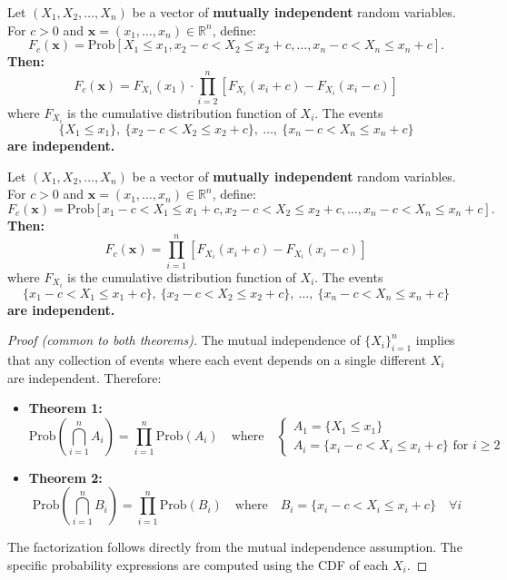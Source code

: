 \documentclass[
	11pt, %
	fleqn, %
	a4paper, %
]{LegrandOrangeBook}
\begin{document}
\begin{theorem}
Let $(X_1, X_2, \dots, X_n)$ be a vector of \textbf{mutually independent} random variables. For $c > 0$ and $\mathbf{x} = (x_1, \dots, x_n) \in \mathbb{R}^n$, define:
\[
F_c(\mathbf{x}) = \mathrm{Prob}\left[ X_1 \leq x_1,  x_2 - c < X_2 \leq x_2 + c,  \dots,  x_n - c < X_n \leq x_n + c \right].
\]
\textbf{Then:}
\begin{equation}\label{eee91a}
\boxed{F_c(\mathbf{x}) = F_{X_1}(x_1) \cdot \prod_{i=2}^n \left[ F_{X_i}(x_i + c) - F_{X_i}(x_i - c) \right]}
\end{equation}
where $F_{X_i}$ is the cumulative distribution function of $X_i$. The events
\[
\{X_1 \leq x_1\},\  \{x_2 - c < X_2 \leq x_2 + c\},\  \dots,\  \{x_n - c < X_n \leq x_n + c\}
\]
\textbf{are independent.}
\end{theorem}

\begin{theorem}
Let $(X_1, X_2, \dots, X_n)$ be a vector of \textbf{mutually independent} random variables. For $c > 0$ and $\mathbf{x} = (x_1, \dots, x_n) \in \mathbb{R}^n$, define:
\[
F_c(\mathbf{x}) = \mathrm{Prob}\left[ x_1 - c < X_1 \leq x_1 + c,  x_2 - c < X_2 \leq x_2 + c,  \dots,  x_n - c < X_n \leq x_n + c \right].
\]
\textbf{Then:}
\begin{equation}\label{eee91b}
\boxed{F_c(\mathbf{x}) = \prod_{i=1}^n \left[ F_{X_i}(x_i + c) - F_{X_i}(x_i - c) \right]}
\end{equation}
where $F_{X_i}$ is the cumulative distribution function of $X_i$. The events
\[
\{x_1 - c < X_1 \leq x_1 + c\},\  \{x_2 - c < X_2 \leq x_2 + c\},\  \dots,\  \{x_n - c < X_n \leq x_n + c\}
\]
\textbf{are independent.}
\end{theorem}

\begin{proof}[Proof (common to both theorems)]
The mutual independence of $\{X_i\}_{i=1}^n$ implies that any collection of events where each event depends on a single different $X_i$ are independent. Therefore:

\begin{itemize}
\item \textbf{Theorem 1:}
\[
\mathrm{Prob}\left( \bigcap_{i=1}^n A_i \right) = \prod_{i=1}^n \mathrm{Prob}(A_i) \quad \text{where} \quad
\begin{cases}
A_1 = \{X_1 \leq x_1\} \\
A_i = \{x_i - c < X_i \leq x_i + c\} \text{ for } i \geq 2
\end{cases}
\]

\item \textbf{Theorem 2:}
\[
\mathrm{Prob}\left( \bigcap_{i=1}^n B_i \right) = \prod_{i=1}^n \mathrm{Prob}(B_i) \quad \text{where} \quad
B_i = \{x_i - c < X_i \leq x_i + c\} \quad \forall i
\]
\end{itemize}
The factorization follows directly from the mutual independence assumption. The specific probability expressions are computed using the CDF of each $X_i$.
\end{proof}
\end{document}
